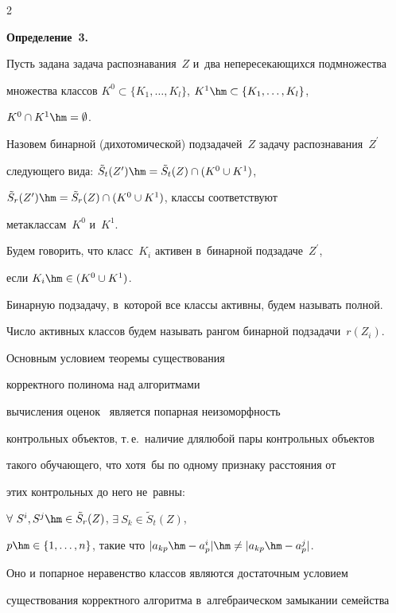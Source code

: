 \begin{multicols}{2}
\noindent


\textbf{Определение~3.}\


Пусть задана задача распознавания~$Z$ и~два непересекающихся подмножества 


множества классов $K^0\subset\{K_1,\ldots,K_l\}$, $K^1\hm\subset\{K_1,\ldots,K_l\}$, 


$K^0\cap K^1\hm=\emptyset$.


Назовем бинарной (дихотомической) подзадачей~$Z$ задачу распознавания~$Z^\prime$ 


следующего вида: $\tilde{S}_t(Z^\prime)\hm=\tilde{S}_t(Z)\cap (K^0\cup K^1)$,


 $\tilde{S}_r(Z^\prime)\hm=\tilde{S}_r(Z)\cap (K^0\cup K^1)$, классы соответствуют 


 метаклассам~$K^0$ и~$K^1$.


Будем говорить, что класс~$K_i$ активен в~бинарной подзадаче~$Z^\prime$, 


если $K_i\hm\in (K^0\cup K^1)$.


Бинарную подзадачу, в~которой все классы активны, будем называть полной.


Число активных классов будем называть рангом бинарной подзадачи~$r(Z_i)$.





\smallskip





Основным условием теоремы существования\linebreak


 корректного полинома над алгоритмами 


вы\-чис\-ления оценок~\cite{zhur1, zhur2} является попарная неизоморфность 


контрольных объектов, т.\,е.\ наличие для\linebreak любой пары контрольных объектов


такого обуча\-юще\-го, что хотя~бы по одному признаку расстояния от 


этих контрольных до него не~равны:


$\forall\ S^i,S^j\hm\in\tilde{S}_r(Z)$, $\exists\ S_k\in\tilde{S}_t(Z)$, 


$p\hm\in\{1,\ldots,n\}$, такие что $|a_{kp}\hm-a^i_p|\hm\neq|a_{kp}\hm-a^j_p|$.


Оно и попарное неравенство классов являются достаточным условием 


существования корректного алгоритма в~алгебраическом замыкании семейства 



\end{multicols}
